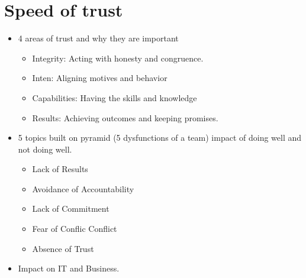 \documentclass{report}
\begin{document}
\chapter*{Speed of trust}
\begin{itemize}
    \item 4 areas of trust and why they are important
        \begin{itemize}[label=$\circ$]
            \item Integrity: Acting with honesty and congruence.
            \item Inten: Aligning motives and behavior
            \item Capabilities: Having the skills and knowledge
            \item Results: Achieving outcomes and keeping promises.
        \end{itemize}
    \item 5 topics built on pyramid (5 dysfunctions of a team) impact of doing well and not doing well.
        \begin{itemize}[label=$\circ$]
            \item  Lack of Results
            \item Avoidance of Accountability
            \item Lack of Commitment
            \item Fear of Conflic Conflict
            \item Absence of Trust
        \end{itemize}
    \item Impact on IT and Business.
\end{itemize}
\end{document}
